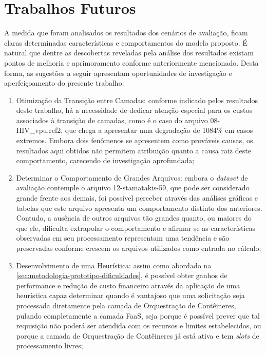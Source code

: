 \documentclass[english,brazilian]{UNISINOSmonografia} %
\begin{document}
\section{Trabalhos Futuros}


A medida que foram analisados os resultados dos cenários de avaliação, ficam claras determinadas características e comportamentos do modelo proposto.
%
É natural que dentre as descobertas reveladas pela análise dos resultados existam pontos de melhoria e aprimoramento conforme anteriormente mencionado.
%
Desta forma, as sugestões a seguir apresentam oportunidades de investigação e aperfeiçoamento do presente trabalho:

\begin{enumerate}[label={\arabic*)}]
	
	\item Otimização da Transição entre Camadas: conforme indicado pelos resultados deste trabalho, há a necessidade de dedicar atenção especial para os custos associados à transição de camadas, como é o caso do arquivo 08-HIV\_vpu.ref2, que chega a apresentar uma degradação de 1084\% em casos extremos.
	Embora dois fenômenos se apresentem como prováveis causas, os resultados aqui obtidos não permitem atribuição quanto a causa raiz deste comportamento, carecendo de investigação aprofundada;
	
	\item Determinar o Comportamento de Grandes Arquivos: embora o \textit{dataset} de avaliação contemple o arquivo 12-stamatakis-59, que pode ser considerado grande frente aos demais, foi possível perceber através das análises gráficas e tabelas que este arquivo apresenta um comportamento distinto dos anteriores.
	Contudo, a ausência de outros arquivos tão grandes quanto, ou maiores do que ele, dificulta extrapolar o comportamento e afirmar se as características observadas em seu processamento representam uma tendência e são preservadas conforme crescem os arquivos utilizados como entrada no cálculo;
	
	\item Desenvolvimento de uma Heurística: assim como abordado na \autoref{sec:metodologia-prototipo-dificuldades}, é possível obter ganhos de performance e redução de custo financeiro através da aplicação de uma heurística capaz determinar quando é vantajoso que uma solicitação seja processada diretamente pela camada de Orquestração de Contêineres, pulando completamente a camada FaaS, seja porque é possível prever que tal requisição não poderá ser atendida com os recursos e limites estabelecidos, ou porque a camada de Orquestração de Contêineres já está ativa e tem \textit{slots} de processamento livres;
	

\end{enumerate}
\end{document}

